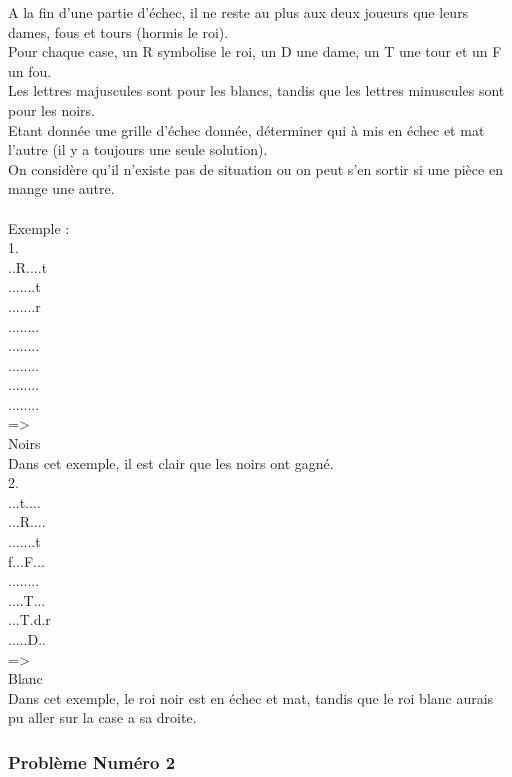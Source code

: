 \documentclass[12pt]{article}
\begin{document}
A la fin d'une partie d'échec, il ne reste au plus aux deux joueurs que leurs dames, fous et tours (hormis le roi).\\
Pour chaque case, un R symbolise le roi, un D une dame, un T une tour et un F un fou.\\
Les lettres majuscules sont pour les blancs, tandis que les lettres minuscules sont pour les noirs.\\
Etant donnée une grille d'échec donnée, déterminer qui à mis en échec et mat l'autre (il y a toujours une seule solution).\\
On considère qu'il n'existe pas de situation ou on peut s'en sortir si une pièce en mange une autre.
\\\\
Exemple :\\
1.\\
..R....t\\
.......t\\
.......r\\
........\\
........\\
........\\
........\\
........\\
=\textgreater\\
Noirs\\
Dans cet exemple, il est clair que les noirs ont gagné.\\
2.\\
...t....\\
...R....\\
.......t\\
f...F...\\
........\\
....T...\\
...T.d.r\\
.....D..\\
=\textgreater\\
Blanc\\
Dans cet exemple, le roi noir est en échec et mat, tandis que le roi blanc aurais pu aller sur la case a sa droite.

\subsubsection{Problème Numéro 2}
\end{document}
